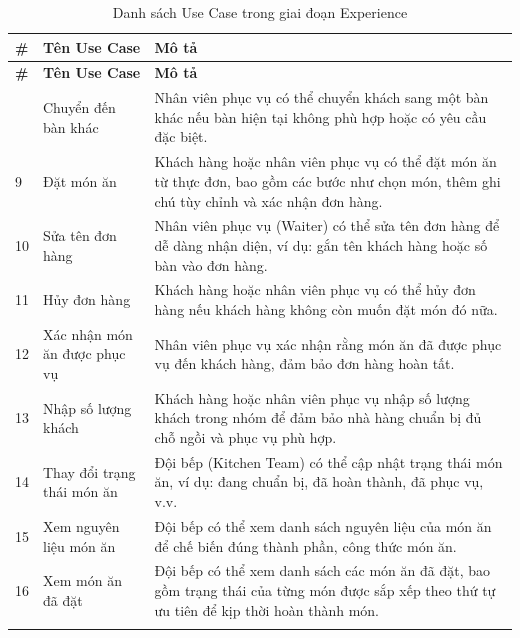        \begin{longtable}{|p{1cm}|p{5cm}|p{9cm}|}
        \hline
        \textbf{\#} & \textbf{Tên Use Case} & \textbf{Mô tả} \\ 
        \hline
        \endfirsthead
        \hline
        \textbf{\#} & \textbf{Tên Use Case} & \textbf{Mô tả} \\ 
        \endhead
        \hline
        \endfoot
        \hline
        \endlastfoot
        8 & Chuyển đến bàn khác & Nhân viên phục vụ có thể chuyển khách sang một bàn khác nếu bàn hiện tại không phù hợp hoặc có yêu cầu đặc biệt. \\ 
        \hline
        9 & Đặt món ăn & Khách hàng hoặc nhân viên phục vụ có thể đặt món ăn từ thực đơn, bao gồm các bước như chọn món, thêm ghi chú tùy chỉnh và xác nhận đơn hàng. \\ 
        \hline
        10 & Sửa tên đơn hàng & Nhân viên phục vụ (Waiter) có thể sửa tên đơn hàng để dễ dàng nhận diện, ví dụ: gắn tên khách hàng hoặc số bàn vào đơn hàng. \\ 
        \hline
        11 & Hủy đơn hàng & Khách hàng hoặc nhân viên phục vụ có thể hủy đơn hàng nếu khách hàng không còn muốn đặt món đó nữa. \\ 
        \hline
        12 & Xác nhận món ăn được phục vụ & Nhân viên phục vụ xác nhận rằng món ăn đã được phục vụ đến khách hàng, đảm bảo đơn hàng hoàn tất. \\ 
        \hline
        13 & Nhập số lượng khách & Khách hàng hoặc nhân viên phục vụ nhập số lượng khách trong nhóm để đảm bảo nhà hàng chuẩn bị đủ chỗ ngồi và phục vụ phù hợp. \\ 
        \hline
        14 & Thay đổi trạng thái món ăn & Đội bếp (Kitchen Team) có thể cập nhật trạng thái món ăn, ví dụ: đang chuẩn bị, đã hoàn thành, đã phục vụ, v.v. \\ 
        \hline
        15 & Xem nguyên liệu món ăn & Đội bếp có thể xem danh sách nguyên liệu của món ăn để chế biến đúng thành phần, công thức món ăn. \\ 
        \hline
        16 & Xem món ăn đã đặt & Đội bếp có thể xem danh sách các món ăn đã đặt, bao gồm trạng thái của từng món được sắp xếp theo thứ tự ưu tiên để kịp thời hoàn thành món. \\ 
        \hline
        \caption{Danh sách Use Case trong giai đoạn Experience}\\
        \end{longtable}

